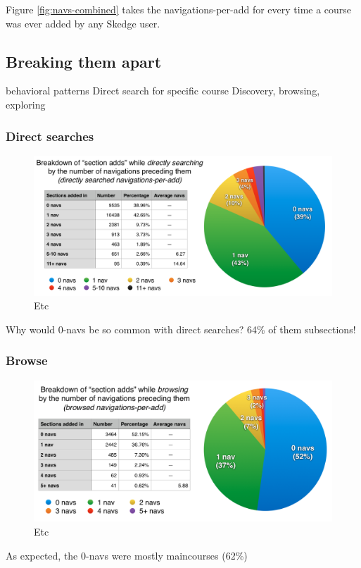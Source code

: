 Figure \ref{fig:navs-combined} takes the navigations-per-add for every time a course was ever added by any Skedge user.


\subsection{Breaking them apart}

  behavioral patterns
  Direct search for specific course
  Discovery, browsing, exploring

  \subsubsection{Direct searches}

  \begin{figure}
    \centering
    \includegraphics[width=1.0\textwidth]{images/graph/direct_navs}

    \caption{Etc}
    \label{fig:searchtypes}
  \end{figure}

  Why would 0-navs be so common with direct searches? 64\% of them subsections!

  \subsubsection{Browse}

  \begin{figure}
    \centering
    \includegraphics[width=1.0\textwidth]{images/graph/browsed_navs}

    \caption{Etc}
    \label{fig:searchtypes}
  \end{figure}

  As expected, the 0-navs were mostly maincourses (62\%)
